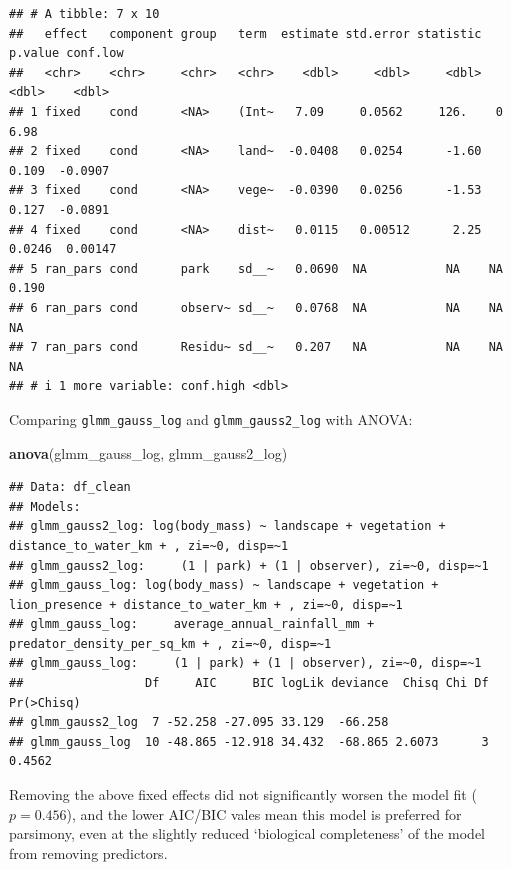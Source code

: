 \documentclass[
]{article}
\newenvironment{Shaded}{\begin{snugshade}}{\end{snugshade}}
\newcommand{\FunctionTok}[1]{\textcolor[rgb]{0.13,0.29,0.53}{\textbf{#1}}}
\newcommand{\NormalTok}[1]{#1}
\begin{document}
\begin{verbatim}
## # A tibble: 7 x 10
##   effect   component group   term  estimate std.error statistic p.value conf.low
##   <chr>    <chr>     <chr>   <chr>    <dbl>     <dbl>     <dbl>   <dbl>    <dbl>
## 1 fixed    cond      <NA>    (Int~   7.09     0.0562     126.    0       6.98   
## 2 fixed    cond      <NA>    land~  -0.0408   0.0254      -1.60  0.109  -0.0907 
## 3 fixed    cond      <NA>    vege~  -0.0390   0.0256      -1.53  0.127  -0.0891 
## 4 fixed    cond      <NA>    dist~   0.0115   0.00512      2.25  0.0246  0.00147
## 5 ran_pars cond      park    sd__~   0.0690  NA           NA    NA       0.190  
## 6 ran_pars cond      observ~ sd__~   0.0768  NA           NA    NA      NA      
## 7 ran_pars cond      Residu~ sd__~   0.207   NA           NA    NA      NA      
## # i 1 more variable: conf.high <dbl>
\end{verbatim}

Comparing \texttt{glmm\_gauss\_log} and \texttt{glmm\_gauss2\_log} with
ANOVA:

\begin{Shaded}
\begin{Highlighting}[]
\FunctionTok{anova}\NormalTok{(glmm\_gauss\_log, glmm\_gauss2\_log)}
\end{Highlighting}
\end{Shaded}

\begin{verbatim}
## Data: df_clean
## Models:
## glmm_gauss2_log: log(body_mass) ~ landscape + vegetation + distance_to_water_km + , zi=~0, disp=~1
## glmm_gauss2_log:     (1 | park) + (1 | observer), zi=~0, disp=~1
## glmm_gauss_log: log(body_mass) ~ landscape + vegetation + lion_presence + distance_to_water_km + , zi=~0, disp=~1
## glmm_gauss_log:     average_annual_rainfall_mm + predator_density_per_sq_km + , zi=~0, disp=~1
## glmm_gauss_log:     (1 | park) + (1 | observer), zi=~0, disp=~1
##                 Df     AIC     BIC logLik deviance  Chisq Chi Df Pr(>Chisq)
## glmm_gauss2_log  7 -52.258 -27.095 33.129  -66.258                         
## glmm_gauss_log  10 -48.865 -12.918 34.432  -68.865 2.6073      3     0.4562
\end{verbatim}

Removing the above fixed effects did not significantly worsen the model
fit (\(p = 0.456\)), and the lower AIC/BIC vales mean this model is
preferred for parsimony, even at the slightly reduced `biological
completeness' of the model from removing predictors.
\end{document}
